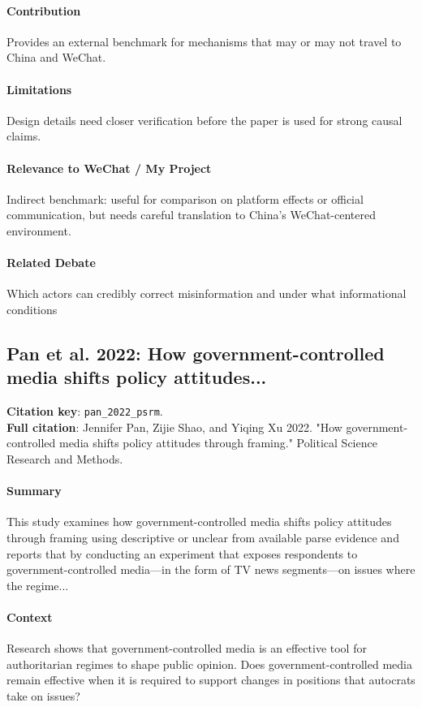 \documentclass[12pt]{article}
\begin{document}
\paragraph{Contribution} Provides an external benchmark for mechanisms that may or may not travel to China and WeChat.

\paragraph{Limitations} Design details need closer verification before the paper is used for strong causal claims.

\paragraph{Relevance to WeChat / My Project} Indirect benchmark: useful for comparison on platform effects or official communication, but needs careful translation to China's WeChat-centered environment.

\paragraph{Related Debate} Which actors can credibly correct misinformation and under what informational conditions


\subsection{Pan et al. 2022: How government-controlled media shifts policy attitudes...}
\textbf{Citation key}: \texttt{pan\_2022\_psrm}.\\
\textbf{Full citation}: Jennifer Pan, Zijie Shao, and Yiqing Xu 2022. "How government-controlled media shifts policy attitudes through framing." Political Science Research and Methods.

\paragraph{Summary} This study examines how government-controlled media shifts policy attitudes through framing using descriptive or unclear from available parse evidence and reports that by conducting an experiment that exposes respondents to government-controlled media---in the form of TV news segments---on issues where the regime...

\paragraph{Context} Research shows that government-controlled media is an effective tool for authoritarian regimes to shape public opinion. Does government-controlled media remain effective when it is required to support changes in positions that autocrats take on issues?
\end{document}

